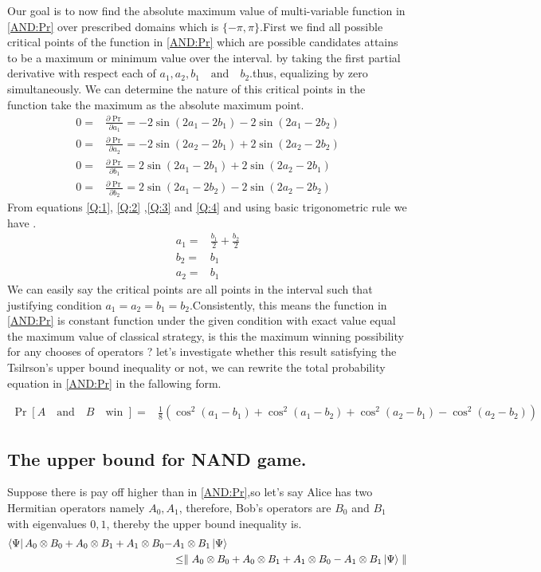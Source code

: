 Our goal is to now find the absolute maximum  value of multi-variable function in \ref{AND:Pr} over prescribed domains which is $\{-\pi,\pi\}$.First we find  all possible critical points of the function in \ref{AND:Pr} which are possible candidates  attains to be a maximum or minimum value over the interval. by taking the first partial derivative with respect each of $a_1,a_2,b_1 \quad \text{and} \quad b_2$.thus, equalizing by zero simultaneously. We can determine the nature of this critical points in the function take the maximum as the absolute maximum point.
\begin{align}
0=&\frac{\partial \Pr}{\partial a_1}=-2\sin(2a_1-2b_1)- 2\sin(2a_1-2b_2)\label{Q:1}\\
0=&\frac{\partial \Pr}{\partial a_2}=-2\sin(2a_2-2b_1)+2\sin(2a_2-2b_2)\label{Q:2}\\
0=&\frac{\partial \Pr}{\partial b_1}=2\sin(2a_1-2b_1)+ 2\sin(2a_2-2b_1)\label{Q:3}\\
0=&\frac{\partial \Pr}{\partial b_2}=2\sin(2a_1-2b_2)- 2\sin(2a_2-2b_2)\label{Q:4}
\end{align}
From equations \ref{Q:1}, \ref{Q:2} ,\ref{Q:3} and \ref{Q:4} and using basic trigonometric rule  we have .
\begin{align}
a_1=&\frac{b_1}{2}+\frac{b_2}{2}\label{QQ:1}\\
b_2=&b_1\label{QQ:2}\\
a_2=&b_1\label{QQ:3}
\end{align} 
We can easily say the critical points are all points in the interval such  that justifying  condition $a_1=a_2= b_1=b_2$.Consistently,  this means the function in \ref{AND:Pr} is constant function under the given condition with exact value equal the maximum value of classical strategy, is this the maximum winning possibility for any chooses of operators ? let's investigate whether this result satisfying the Tsilrson's upper bound inequality or not, we can rewrite the total probability equation in \ref{AND:Pr} in the fallowing form.

\begin{align}\label{NAND:Pr}
\Pr[A\quad \text{and}\quad B \quad \text{win }  ]=&\frac{1}{8}\left( \cos^2(a_1-b_1)+\cos^2(a_1-b_2)
+\cos^2(a_2-b_1)-\cos^2(a_2-b_2)\right)
\end{align}
\subsection{The upper bound for NAND game.}
Suppose  there is pay off higher than  in \ref{AND:Pr},so let's say Alice has two Hermitian  operators  namely $A_0 ,A_1$, therefore, Bob's operators are $B_0$ and $B_1$  with eigenvalues $0,1$, thereby the upper bound inequality is.
\begin{align}\label{GGG}
\bra{\Psi} A_0\otimes B_0+A_0\otimes B_1+A_1\otimes B_0-& A_1\otimes B_1 \ket{\Psi}\nonumber\\
& \leq \parallel A_0\otimes B_0+A_0\otimes B_1+A_1\otimes B_0-A_1\otimes B_1 \ket{\Psi} \parallel
\end{align}


